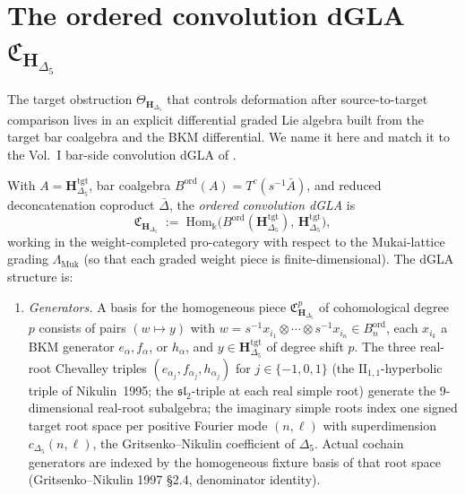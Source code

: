 \section{The ordered convolution dGLA \texorpdfstring{$\mathfrak{C}_{\mathbf{H}_{\Delta_5}}$}{C-H-Delta-5}}
\label{sec:kcb-convolution-dgla}

The target obstruction
$\Theta_{\mathbf{H}_{\Delta_5}}$ that controls deformation after
source-to-target comparison lives in an explicit differential graded Lie
algebra built from the target bar coalgebra and the BKM differential. We
name it here and match it to the Vol.~I
bar-side convolution dGLA of
\cite{VolI}.

\begin{definition}
\label{def:kcb-convolution-dgla}
With $A = \mathbf{H}_{\Delta_5}^{\mathrm{tgt}}$, bar coalgebra
$B^{\mathrm{ord}}(A) = T^c(s^{-1}\bar A)$, and reduced deconcatenation
coproduct $\bar\Delta$, the \emph{ordered convolution dGLA} is
\[
 \mathfrak{C}_{\mathbf{H}_{\Delta_5}}
 \;:=\;
 \mathrm{Hom}_{\Bbbk}\!\bigl(B^{\mathrm{ord}}(\mathbf{H}_{\Delta_5}^{\mathrm{tgt}}),\,
 \mathbf{H}_{\Delta_5}^{\mathrm{tgt}}\bigr),
\]
working in the weight-completed pro-category with respect to the
Mukai-lattice grading $\Lambda_{\mathrm{Muk}}$
(so that each graded weight piece is finite-dimensional). The dGLA
structure is:
\begin{enumerate}[label=\textup{(\alph*)}]
\item \emph{Generators.} A basis for the homogeneous piece
 $\mathfrak{C}^p_{\mathbf{H}_{\Delta_5}}$ of cohomological degree $p$
 consists of pairs $(w\mapsto y)$ with
 $w = s^{-1}x_{i_1}\otimes\cdots\otimes s^{-1}x_{i_n}\in
 B^{\mathrm{ord}}_n$, each $x_{i_k}$ a BKM generator
 $e_\alpha, f_\alpha$, or $h_\alpha$, and
 $y\in\mathbf{H}_{\Delta_5}^{\mathrm{tgt}}$ of degree shift $p$. The three real-root
 Chevalley triples $(e_{\alpha_j}, f_{\alpha_j}, h_{\alpha_j})$
 for $j\in\{-1,0,1\}$ (the $\mathrm{II}_{1,1}$-hyperbolic triple of
 Nikulin~1995; the $\mathfrak{sl}_2$-triple at each real simple root)
 generate the $9$-dimensional real-root subalgebra; the imaginary
 simple roots index one signed target root space per positive Fourier
 mode $(n,\ell)$ with superdimension $c_{\Delta_5}(n,\ell)$, the
 Gritsenko--Nikulin coefficient of $\Delta_5$. Actual cochain generators
 are indexed by the homogeneous fixture basis of that root space
 (Gritsenko--Nikulin 1997 \S 2.4, denominator identity).

\end{enumerate}
\end{definition}
